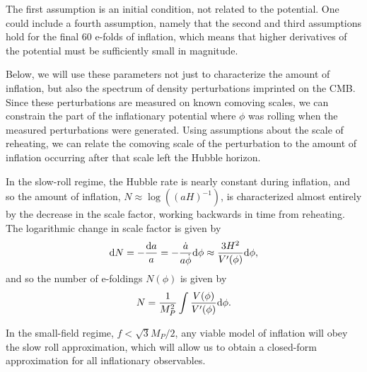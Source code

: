 \documentclass[aps,amsfonts,amsmath,prd,preprint,nofootinbib,superscriptaddress]{revtex4}
\newcommand{\Mp}{{M_{P}}}
\newcommand{\MMp}{{M_P^2}}
\newcommand{\rmd}{{\rm d}}
\begin{document}
\begin{appendix}
The first assumption is an initial condition, not related to the potential.
One could include a fourth assumption, namely that the second and third assumptions hold for the final 60 e-folds of inflation, which means that higher derivatives
of the potential must be sufficiently small in magnitude.



Below, we will use these parameters not just to characterize the amount of inflation, but also the spectrum
of density perturbations imprinted on the CMB.  Since these perturbations are measured on known comoving scales, we
can constrain the part of the inflationary potential where $\phi$ was rolling when the measured perturbations were generated.  Using assumptions about the
scale of reheating, we can relate the comoving scale of the perturbation to the amount of inflation occurring after that scale left the Hubble horizon.  

In the slow-roll regime, the Hubble rate is nearly constant during inflation, and so the amount of inflation, $N \approx \log\left((a H)^{-1}\right)$, is characterized 
almost entirely  by the decrease in the scale factor, working backwards in time from reheating.
The logarithmic change in scale factor is given by
\begin{align}
\rmd N = -\frac{\rmd a}{a} = -\frac{\dot a}{a\dot\phi}\rmd\phi \approx \frac{3H^2}{V'(\phi)}\rmd\phi,
\end{align}
and so the number of e-foldings $N(\phi)$ is given by
\begin{align}
N = \frac{1}{\MMp}\int \frac{V(\phi)}{V'(\phi)}\rmd\phi.
\end{align}





In the small-field regime, $f <\sqrt{3}\Mp/2$, any viable model of inflation will obey the slow roll approximation,
which will allow us to obtain a closed-form approximation for all inflationary observables.  








































\end{appendix}
\end{document}
